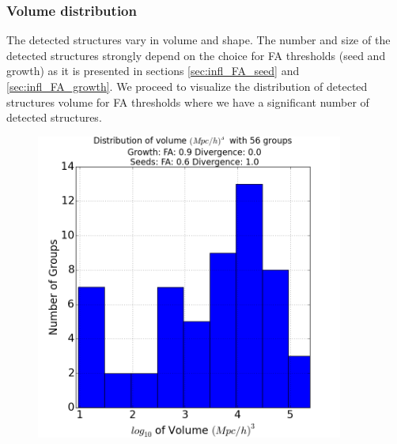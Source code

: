 \documentclass[12pt]{article}
\begin{document}
\subsubsection{Volume distribution}

\begin{par}
The detected structures vary in volume and shape.
 The number and size of the detected structures
  strongly depend on the choice for FA thresholds
   (seed and growth) as it is presented in sections
    \ref{sec:infl_FA_seed} and
     \ref{sec:infl_FA_growth}.
     We proceed to visualize the distribution of
      detected structures volume for FA thresholds
       where we have a significant number of
        detected structures.
\end{par}

\begin{figure}[ht]
\centering
\begin{minipage}{.5\textwidth}
  \centering
  \includegraphics[width=0.9\textwidth]{groups/volumeplots/volumes_distr_Mpc_06_Trace_10_search_FA_09_Trace_00.png} %
\end{minipage}%
\begin{minipage}{.5\textwidth}
  \centering

\end{minipage}
\end{figure}
\end{document}
